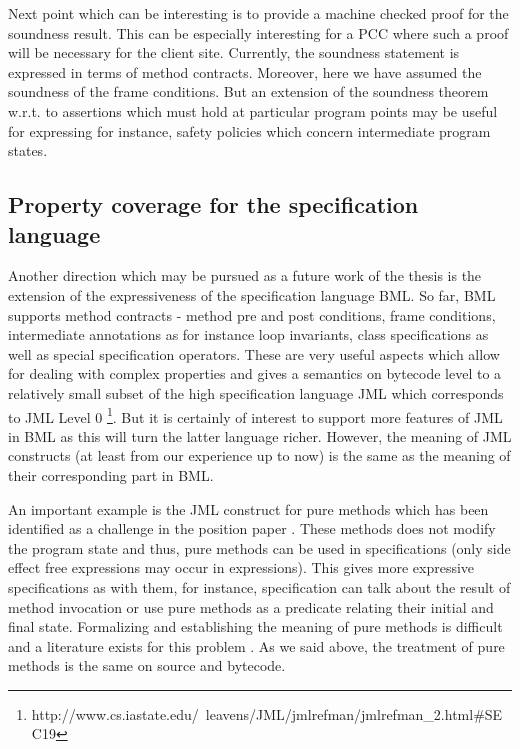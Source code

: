 Next point which can be interesting is to provide a machine checked proof for the soundness result. 
This can be especially interesting for a PCC where such a proof will be necessary for the client site. 
Currently, the soundness statement is expressed in terms of method contracts. 
Moreover, here we have assumed the soundness of the frame conditions.
But an extension  of the soundness theorem w.r.t. to assertions which must hold at particular program points may be useful for
expressing for instance, safety policies which concern intermediate program states.


\subsection{Property coverage for the specification language}
Another direction which may be pursued as a future work of the thesis  is the extension of the expressiveness of the specification language BML. 
So far, BML supports method contracts - method pre and post  conditions, frame conditions, intermediate annotations as for instance
loop invariants, class specifications as well as special specification operators.
These are very useful aspects which allow for dealing with complex properties and 
gives a semantics on bytecode level  to a relatively small subset of the 
high specification language JML which corresponds to JML Level 0 \footnote{ http://www.cs.iastate.edu/~leavens/JML/jmlrefman/jmlrefman\_2.html\#SEC19}. 
 But it is certainly of interest to support more features of JML in BML
as this will turn the latter language richer. However, the meaning  of JML constructs 
(at least from our experience up to  now) is the same as the meaning of their corresponding part in BML.  

 An important example is the  JML construct for pure methods which has been  identified as  a challenge in the position paper \cite{LeavensLeinoMueller06}. 
 These methods does not modify the program state and thus, pure methods can be used in specifications 
 (only side effect free  expressions may occur in expressions).
 This gives more expressive  specifications as with them, for instance, specification can talk about the result of method invocation or use pure methods
 as a predicate relating their  initial and final state. 
 Formalizing and establishing the meaning of pure methods is difficult and a literature exists for this problem \cite{DarvasMueller06}.
 As we said above, the treatment of pure methods is the same on source and bytecode.

